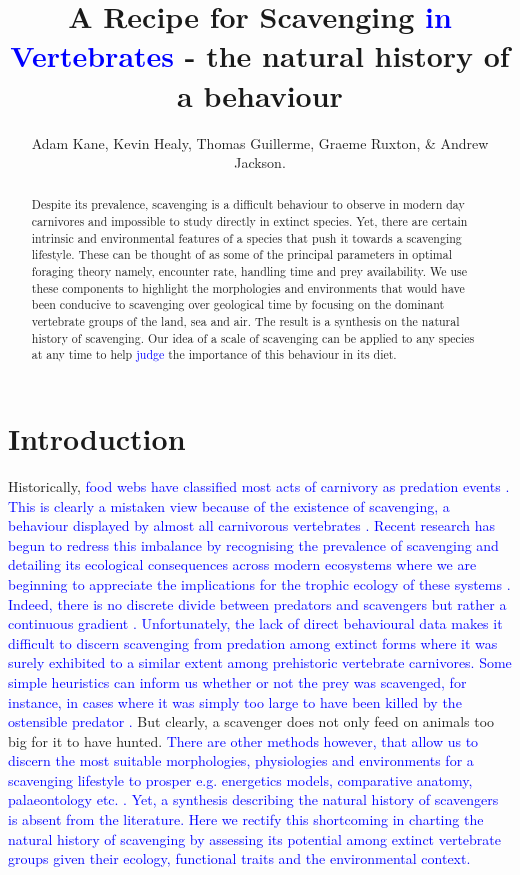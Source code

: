 \documentclass[a4paper,12pt]{article}
\title{A Recipe for Scavenging \textcolor{blue}{in Vertebrates} - the natural history of a behaviour}
\author{Adam Kane, Kevin Healy, Thomas Guillerme, Graeme Ruxton, \& Andrew Jackson.}
\begin{document}
\maketitle


\begin{abstract} 
Despite its prevalence, scavenging is a difficult behaviour to observe in modern day carnivores and impossible to study directly in extinct species. 
Yet, there are certain intrinsic and environmental features of a species that push it towards a scavenging lifestyle. 
These can be thought of as some of the principal parameters in optimal foraging theory namely, encounter rate, handling time and prey availability. 
We use these components to highlight the morphologies and environments that would have been conducive to scavenging over geological time by focusing on the dominant vertebrate groups of the land, sea and air. 
The result is a synthesis on the natural history of scavenging. 
Our idea of a scale of scavenging can be applied to any species at any time to help \textcolor{blue}{judge} the importance of this behaviour in its diet. 
\end{abstract}

\newpage


\section{Introduction}

Historically, \textcolor{blue}{food webs have classified most acts of carnivory as predation events \citep{wilson2011scavenging}. 
This is clearly a mistaken view because of the existence of scavenging, a behaviour displayed by almost all carnivorous vertebrates \citep{devault2003scavenging}. 
Recent research has begun to redress this imbalance by recognising the prevalence of scavenging and detailing its ecological consequences across modern ecosystems where we are beginning to appreciate the implications for the trophic ecology of these systems \citep{pereira2014facultative,periquet2015lion}.
Indeed, there is no discrete divide between predators and scavengers but rather a continuous gradient \citep{pereira2014facultative}.
Unfortunately, the lack of direct behavioural data makes it difficult to discern scavenging from predation among extinct forms where it was surely exhibited to a similar extent among prehistoric vertebrate carnivores.
Some simple heuristics can inform us whether or not the prey was scavenged, for instance, in cases where it was simply too large to have been killed by the ostensible predator \citep{pobiner2008paleoecological}.}
But clearly, a scavenger does not only feed on animals too big for it to have hunted.
\textcolor{blue}{There are other methods however, that allow us to discern the most suitable morphologies, physiologies and environments for a scavenging lifestyle to prosper e.g. energetics models, comparative anatomy, palaeontology etc. \citep{shipman1986scavenging,ruxton2003could}. 
Yet, a synthesis describing the natural history of scavengers is absent from the literature.
Here we rectify this shortcoming in charting the natural history of scavenging by assessing its potential among extinct vertebrate groups given their ecology, functional traits and the environmental context.}
\end{document}
